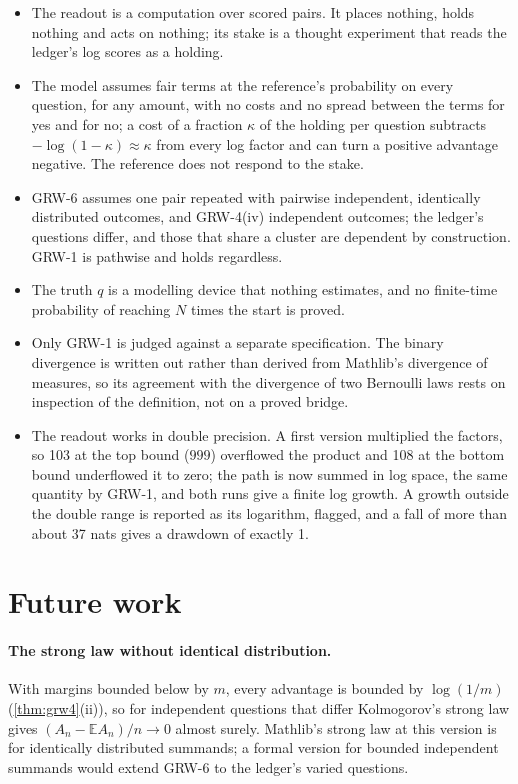 \documentclass[11pt]{article}
\theoremstyle{plain}
\theoremstyle{definition}
\theoremstyle{remark}
\newcommand{\E}{\mathbb{E}}
\begin{document}
\begin{itemize}
  \item The readout is a computation over scored pairs. It places nothing, holds nothing and acts on
    nothing; its stake is a thought experiment that reads the ledger's log scores as a holding.
  \item The model assumes fair terms at the reference's probability on every question, for any
    amount, with no costs and no spread between the terms for yes and for no; a cost of a fraction
    $\kappa$ of the holding per question subtracts $-\log(1-\kappa)\approx\kappa$ from every log
    factor and can turn a positive advantage negative. The reference does not respond to the stake.
  \item GRW-6 assumes one pair repeated with pairwise independent, identically distributed outcomes,
    and GRW-4(iv) independent outcomes; the ledger's questions differ, and those that share a
    cluster are dependent by construction. GRW-1 is pathwise and holds regardless.
  \item The truth $q$ is a modelling device that nothing estimates, and no finite-time probability
    of reaching $N$ times the start is proved.
  \item Only GRW-1 is judged against a separate specification. The binary divergence is written out
    rather than derived from Mathlib's divergence of measures, so its agreement with the divergence
    of two Bernoulli laws rests on inspection of the definition, not on a proved bridge.
  \item The readout works in double precision. A first version multiplied the factors, so 103 at
    the top bound ($999$) overflowed the product and 108 at the bottom bound underflowed it to zero;
    the path is now summed in log space, the same quantity by GRW-1, and both runs give a finite log
    growth. A growth outside the double range is reported as its logarithm, flagged, and a fall of
    more than about 37 nats gives a drawdown of exactly 1.
\end{itemize}

\section{Future work}
\label{sec:future}

\paragraph{The strong law without identical distribution.} With margins bounded below by $m$,
every advantage is bounded by $\log(1/m)$ (\cref{thm:grw4}(ii)), so for independent questions that
differ Kolmogorov's strong law gives $(A_n-\E A_n)/n\to0$ almost surely. Mathlib's strong law at
this version is for identically distributed summands; a formal version for bounded independent
summands would extend GRW-6 to the ledger's varied questions.
\end{document}
